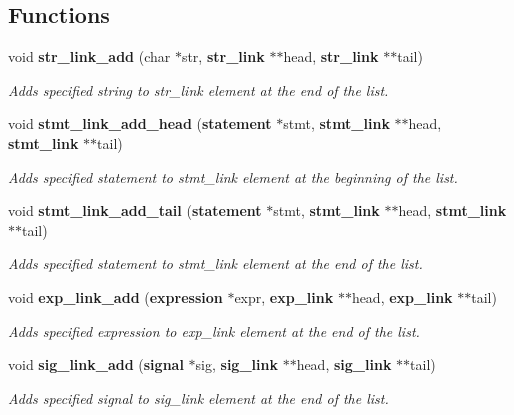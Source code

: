 \subsection*{Functions}
\begin{CompactItemize}
\item 
void {\bf str\_\-link\_\-add} (char $\ast$str, {\bf str\_\-link} $\ast$$\ast$head, {\bf str\_\-link} $\ast$$\ast$tail)
\begin{CompactList}\small\item\em Adds specified string to str\_\-link element at the end of the list.\item\end{CompactList}\item 
void {\bf stmt\_\-link\_\-add\_\-head} ({\bf statement} $\ast$stmt, {\bf stmt\_\-link} $\ast$$\ast$head, {\bf stmt\_\-link} $\ast$$\ast$tail)
\begin{CompactList}\small\item\em Adds specified statement to stmt\_\-link element at the beginning of the list.\item\end{CompactList}\item 
void {\bf stmt\_\-link\_\-add\_\-tail} ({\bf statement} $\ast$stmt, {\bf stmt\_\-link} $\ast$$\ast$head, {\bf stmt\_\-link} $\ast$$\ast$tail)
\begin{CompactList}\small\item\em Adds specified statement to stmt\_\-link element at the end of the list.\item\end{CompactList}\item 
void {\bf exp\_\-link\_\-add} ({\bf expression} $\ast$expr, {\bf exp\_\-link} $\ast$$\ast$head, {\bf exp\_\-link} $\ast$$\ast$tail)
\begin{CompactList}\small\item\em Adds specified expression to exp\_\-link element at the end of the list.\item\end{CompactList}\item 
void {\bf sig\_\-link\_\-add} ({\bf signal} $\ast$sig, {\bf sig\_\-link} $\ast$$\ast$head, {\bf sig\_\-link} $\ast$$\ast$tail)
\begin{CompactList}\small\item\em Adds specified signal to sig\_\-link element at the end of the list.\item\end{CompactList}\item 

\end{CompactItemize}
